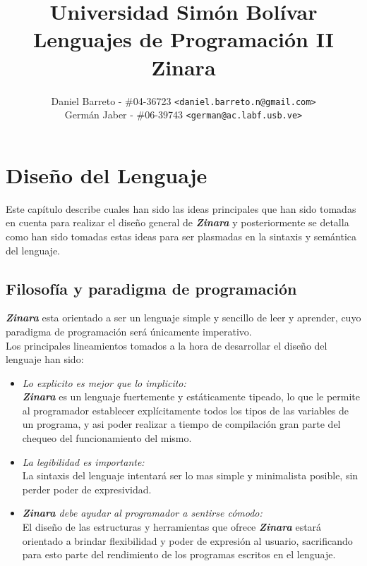 \documentclass[12pt, spanish]{report}
\begin{document}
\title{Universidad Simón Bolívar \\ Lenguajes de Programación II \\ Zinara}
\author{
  Daniel Barreto - \#04-36723 \texttt{<daniel.barreto.n@gmail.com>} \\
  Germán Jaber - \#06-39743 \texttt{<german@ac.labf.usb.ve>}
}
\maketitle

\tableofcontents

\newpage


\chapter{Diseño del Lenguaje}
\label{chap:diseno}

Este capítulo describe cuales han sido las ideas principales que han
sido tomadas en cuenta para realizar el diseño general de
\emph{\textbf{Zinara}} y posteriormente se detalla como han sido
tomadas estas ideas para ser plasmadas en la sintaxis y semántica del
lenguaje.


\section{Filosofía y paradigma de programación}
\label{sec:filpar}

\textbf{\emph{Zinara}} esta orientado a ser un lenguaje simple y
sencillo de leer y aprender, cuyo paradigma de programación será
únicamente imperativo.\\

Los principales lineamientos tomados a la hora de desarrollar el
diseño del lenguaje han sido:

\begin{itemize}
\item \emph{Lo explicito es mejor que lo implicito:}\\
  \emph{\textbf{Zinara}} es un lenguaje fuertemente y estáticamente
  tipeado, lo que le permite al programador establecer explícitamente
  todos los tipos de las variables de un programa, y asi poder
  realizar a tiempo de compilación gran parte del chequeo del
  funcionamiento del mismo.

\item \emph{La legibilidad es importante:}\\
  La sintaxis del lenguaje intentará ser lo mas simple y minimalista
  posible, sin perder poder de expresividad.

\item \emph{\textbf{Zinara} debe ayudar al programador a sentirse
    cómodo:}\\
  El diseño de las estructuras y herramientas que ofrece
  \emph{\textbf{Zinara}} estará orientado a brindar flexibilidad y
  poder de expresión al usuario, sacrificando para esto parte del
  rendimiento de los programas escritos en el lenguaje.
\end{itemize}
\end{document}
